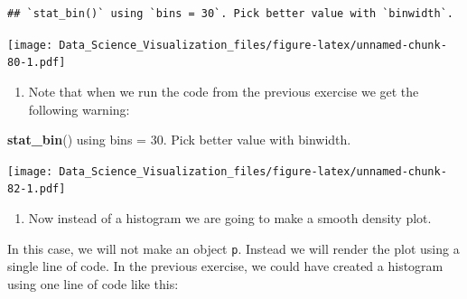 \documentclass[
]{article}
\newenvironment{Shaded}{\begin{snugshade}}{\end{snugshade}}
\newcommand{\CommentTok}[1]{\textcolor[rgb]{0.56,0.35,0.01}{\textit{#1}}}
\newcommand{\DataTypeTok}[1]{\textcolor[rgb]{0.13,0.29,0.53}{#1}}
\newcommand{\DecValTok}[1]{\textcolor[rgb]{0.00,0.00,0.81}{#1}}
\newcommand{\FloatTok}[1]{\textcolor[rgb]{0.00,0.00,0.81}{#1}}
\newcommand{\KeywordTok}[1]{\textcolor[rgb]{0.13,0.29,0.53}{\textbf{#1}}}
\newcommand{\NormalTok}[1]{#1}
\newcommand{\OperatorTok}[1]{\textcolor[rgb]{0.81,0.36,0.00}{\textbf{#1}}}
\newcommand{\StringTok}[1]{\textcolor[rgb]{0.31,0.60,0.02}{#1}}
\providecommand{\tightlist}{%
  \setlength{\itemsep}{0pt}\setlength{\parskip}{0pt}}
\begin{document}
\begin{verbatim}
## `stat_bin()` using `bins = 30`. Pick better value with `binwidth`.
\end{verbatim}

\texttt{[image: Data\_Science\_Visualization\_files/figure-latex/unnamed-chunk-80-1.pdf]}

\begin{enumerate}
\def\labelenumi{\arabic{enumi}.}
\setcounter{enumi}{17}
\tightlist
\item
  Note that when we run the code from the previous exercise we get the
  following warning:
\end{enumerate}

\begin{Shaded}
\begin{Highlighting}[]
\KeywordTok{stat_bin}\NormalTok{() using bins =}\StringTok{ }\FloatTok{30.}\NormalTok{ Pick better value with binwidth.}
\end{Highlighting}
\end{Shaded}

\begin{Shaded}
\end{Shaded}

\texttt{[image: Data\_Science\_Visualization\_files/figure-latex/unnamed-chunk-82-1.pdf]}

\begin{enumerate}
\def\labelenumi{\arabic{enumi}.}
\setcounter{enumi}{18}
\tightlist
\item
  Now instead of a histogram we are going to make a smooth density plot.
\end{enumerate}

In this case, we will not make an object \texttt{p}. Instead we will
render the plot using a single line of code. In the previous exercise,
we could have created a histogram using one line of code like this:

\begin{Shaded}
\end{Shaded}
\end{document}

